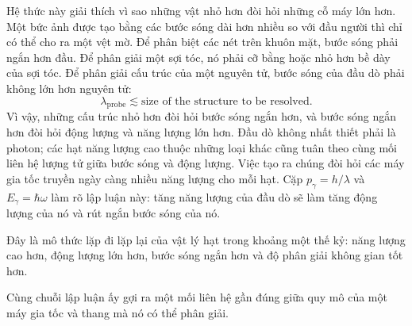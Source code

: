 Hệ thức này giải thích vì sao những vật nhỏ hơn đòi hỏi những cỗ máy lớn hơn. Một bức ảnh được tạo bằng các bước sóng dài hơn nhiều so với đầu người thì chỉ có thể cho ra một vệt mờ. Để phân biệt các nét trên khuôn mặt, bước sóng phải ngắn hơn đầu. Để phân giải một sợi tóc, nó phải cỡ bằng hoặc nhỏ hơn bề dày của sợi tóc. Để phân giải cấu trúc của một nguyên tử, bước sóng của đầu dò phải không lớn hơn nguyên tử:
\begin{equation}
\lambda_{\mathrm{probe}}\lesssim
\text{size of the structure to be resolved}.
\end{equation}
Vì vậy, những cấu trúc nhỏ hơn đòi hỏi bước sóng ngắn hơn, và bước sóng ngắn hơn đòi hỏi động lượng và năng lượng lớn hơn. Đầu dò không nhất thiết phải là photon; các hạt năng lượng cao thuộc những loại khác cũng tuân theo cùng mối liên hệ lượng tử giữa bước sóng và động lượng. Việc tạo ra chúng đòi hỏi các máy gia tốc truyền ngày càng nhiều năng lượng cho mỗi hạt. Cặp \(p_\gamma=h/\lambda\) và \(E_\gamma=\hbar\omega\) làm rõ lập luận này: tăng năng lượng của đầu dò sẽ làm tăng động lượng của nó và rút ngắn bước sóng của nó.

Đây là mô thức lặp đi lặp lại của vật lý hạt trong khoảng một thế kỷ: năng lượng cao hơn, động lượng lớn hơn, bước sóng ngắn hơn và độ phân giải không gian tốt hơn.

\begin{classroomqa}
\end{classroomqa}

Cùng chuỗi lập luận ấy gợi ra một mối liên hệ gần đúng giữa quy mô của một máy gia tốc và thang mà nó có thể phân giải.

\begin{classroomqa}
\end{classroomqa}

